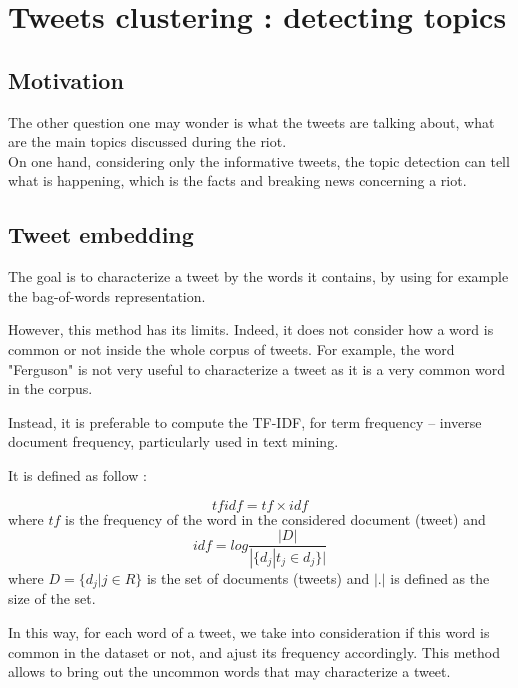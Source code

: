 \documentclass[a4paper,12pt]{report}
\begin{document}

\chapter{Tweets clustering : detecting topics}

\section{Motivation}
The other question one may wonder is what the tweets are talking about, what are the main topics discussed during the riot. \\

On one hand, considering only the informative tweets, the topic detection can tell what is happening, which is the facts and breaking news concerning a riot.
\newpage

\section{Tweet embedding}

The goal is to characterize a tweet by the words it contains, by using for example the bag-of-words representation.

However, this method has its limits. Indeed, it does not consider how a word is common or not inside the whole corpus of tweets. For example, the word "Ferguson" is not very useful to characterize a tweet as it is a very common word in the corpus.

Instead, it is preferable to compute the TF-IDF, for term frequency – inverse document frequency, particularly used in text mining.

It is defined as follow : 

$$tfidf = tf \times idf$$ 
where 
$tf$ is the frequency of the word in the considered document (tweet) and
$$idf = log \frac{|D|}{|\{d_j | t_j \in d_j\}|}$$
where $D = \{d_j | j\in R\} $ is the set of documents (tweets) and $|.|$ is defined as the size of the set.

In this way, for each word of a tweet, we take into consideration if this word is common in the dataset or not, and ajust its frequency accordingly. This method allows to bring out the uncommon words that may characterize a tweet.
\end{document}

